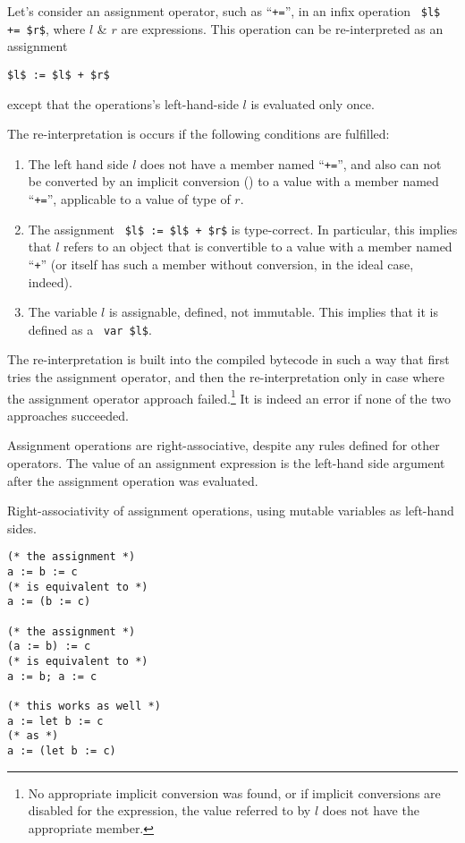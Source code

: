 Let's consider an assignment operator, such as ``\lstinline!+=!'', in an infix operation ~\lstinline!$l$ += $r$!, where $l$ \& $r$ are expressions. This operation can be re-interpreted as an assignment
\begin{lstlisting}
$l$ := $l$ + $r$
\end{lstlisting}
except that the operations's left-hand-side $l$ is evaluated only once. 

The re-interpretation is occurs if the following conditions are fulfilled:
\begin{enumerate}
  \item The left hand side $l$ does not have a member named ``\lstinline!+=!'', and also can not be converted by an implicit conversion () to a value with a member named ``\lstinline!+=!'', applicable to a value of type of $r$. 
  \item The assignment ~\lstinline!$l$ := $l$ + $r$! is type-correct. In particular, this implies that $l$ refers to an object that is convertible to a value with a member named ``\lstinline!+!'' (or itself has such a member without conversion, in the ideal case, indeed). 
  \item The variable $l$ is assignable, defined, not immutable. This implies that it is defined as a ~\lstinline!var $l$!. 
\end{enumerate}

The re-interpretation is built into the compiled bytecode in such a way that first tries the assignment operator, and then the re-interpretation only in case where the assignment operator approach failed.\footnote{No appropriate implicit conversion was found, or if implicit conversions are disabled for the expression, the value referred to by $l$ does not have the appropriate member.} It is indeed an error if none of the two approaches succeeded. 

Assignment operations are right-associative, despite any rules defined for other operators. The value of an assignment expression is the left-hand side argument after the assignment operation was evaluated. 

\example Right-associativity of assignment operations, using mutable variables as left-hand sides. 
\begin{lstlisting}
(* the assignment *)
a := b := c
(* is equivalent to *)
a := (b := c)

(* the assignment *)
(a := b) := c
(* is equivalent to *)
a := b; a := c

(* this works as well *)
a := let b := c
(* as *)
a := (let b := c)
\end{lstlisting}




